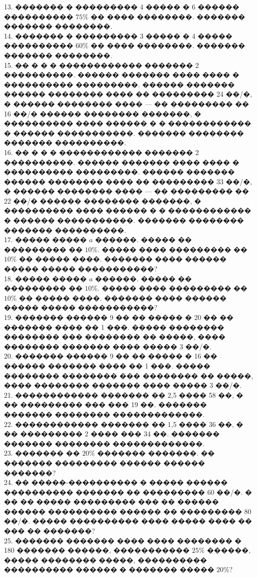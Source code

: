 \documentclass[12pt]{article}
\begin{document}
13. ������� � ��������� 4 ����� � 6 ������ ���������� $75\%$ �� ���� ��������. ������� ������� ��������.\\
14. ������� � ��������� 3 ����� � 4 ����� ���������� $60\%$ �� ���� ��������. ������� ������� ��������.\\
15. �� � � � ������������ ������� 2 ����������. ������ ������� ���� ���� � ���������� ���������. ������ ������� ������ �������� ���� �� ��������� 24 ��/�, � ������ �������� ���� --- �� ��������� �� 16 ��/� ������ �������� �������, � ���������� ���� ������ � � ������������ � ������ �����������. ������� �������� ������� ����������.\\
16. �� � � � ������������ ������� 2 ����������. ������ ������� ���� ���� � ���������� ���������. ������ ������� ������ �������� ���� �� ��������� 33 ��/�, � ������ �������� ���� --- �� ��������� �� 22 ��/� ������ �������� �������, � ���������� ���� ������ � � ������������ � ������ �����������. ������� �������� ������� ����������.\\
17. ����� ����� $a$ ������. ����� �� ��������� �� $10\%.$ ����� ���� ��������� �� $10\%$ �� ����� ����. ������� ���� ������ ����� ����� �����������?\\
18. ����� ����� $a$ ������. ����� �� ��������� �� $10\%.$ ����� ���� ��������� �� $10\%$ �� ����� ����. ������� ���� ������ ����� ����� �����������?\\
19. ������� ������ 9 �� �� ����� � 20 �� �� ������� ���� �� 1 ���. ����� �������� �������� ��� �������� �� �����, ���� �������� ������� ���� ����� 3 ��/�.\\
20. ������� ������ 9 �� �� ����� � 16 �� ������ ������� ���� �� 1 ���. ����� �������� �������� ��� �������� �� �����, ���� �������� ������� ���� ����� 3 ��/�.\\
21. ������������ ������� �� 2,5 ���� 58 ��, � �� ��������� ��� ��� 19 ��. ������� ������� �������� �������������.\\
22. ������������ ������� �� 1,5 ���� 36 ��, � �� ��������� 2 ���� ��� 34 ��. ������� ������� �������� �������������.\\
23. ������� �� $20\%$ ������� �������. �� ������� ��������� ������ ������ �������?\\
24. �� �����-���������� � ����� ������ ���������� ������� �� ��������� 60 ��/�. � �� �� ����� ��������� ��� �� ������ ������ ���������� ������ �� ��������� 80 ��/�. ����� ���������� ���� ����� ���� �� ��� �� �������?\\
25. ������� ������� ���� ���� �������� � 180 ������� ������, ����������� $25\%$ ������, ����� �������� �����, ���������� ���������� ������ � ������� ����� $20\%?$\\
\end{document}
